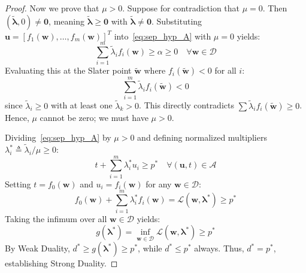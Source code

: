 \begin{proof}
Now we prove that $\mu > 0$. Suppose for contradiction that $\mu = 0$. Then $(\tilde{\boldsymbol{\lambda}}, 0) \ne \mathbf{0}$, meaning $\tilde{\boldsymbol{\lambda}} \ge \mathbf{0}$ with $\tilde{\boldsymbol{\lambda}} \ne \mathbf{0}$.
Substituting $\mathbf{u} = [f_1(\mathbf{w}), \dots, f_m(\mathbf{w})]^T$ into~\eqref{eq:sep_hyp_A} with $\mu = 0$ yields:
\begin{equation}
\sum_{i=1}^m \tilde{\lambda}_i f_i(\mathbf{w}) \ge \alpha \ge 0 \quad \forall \mathbf{w} \in \mathcal{D}
\end{equation}
Evaluating this at the Slater point $\tilde{\mathbf{w}}$ where $f_i(\tilde{\mathbf{w}}) < 0$ for all $i$:
\begin{equation}
\sum_{i=1}^m \tilde{\lambda}_i f_i(\tilde{\mathbf{w}}) < 0
\end{equation}
since $\tilde{\lambda}_i \ge 0$ with at least one $\tilde{\lambda}_k > 0$. This directly contradicts $\sum \tilde{\lambda}_i f_i(\tilde{\mathbf{w}}) \ge 0$.
Hence, $\mu$ cannot be zero; we must have $\mu > 0$.

Dividing~\eqref{eq:sep_hyp_A} by $\mu > 0$ and defining normalized multipliers $\lambda_i^* \triangleq \tilde{\lambda}_i / \mu \ge 0$:
\begin{equation}
t + \sum_{i=1}^m \lambda_i^* u_i \ge p^* \quad \forall (\mathbf{u}, t) \in \mathcal{A}
\end{equation}
Setting $t = f_0(\mathbf{w})$ and $u_i = f_i(\mathbf{w})$ for any $\mathbf{w} \in \mathcal{D}$:
\begin{equation}
f_0(\mathbf{w}) + \sum_{i=1}^m \lambda_i^* f_i(\mathbf{w}) = \mathcal{L}(\mathbf{w}, \boldsymbol{\lambda}^*) \ge p^*
\end{equation}
Taking the infimum over all $\mathbf{w} \in \mathcal{D}$ yields:
\begin{equation}
g(\boldsymbol{\lambda}^*) = \inf_{\mathbf{w} \in \mathcal{D}} \mathcal{L}(\mathbf{w}, \boldsymbol{\lambda}^*) \ge p^*
\end{equation}
By Weak Duality, $d^* \ge g(\boldsymbol{\lambda}^*) \ge p^*$, while $d^* \le p^*$ always. Thus, $d^* = p^*$, establishing Strong Duality.
\end{proof}

